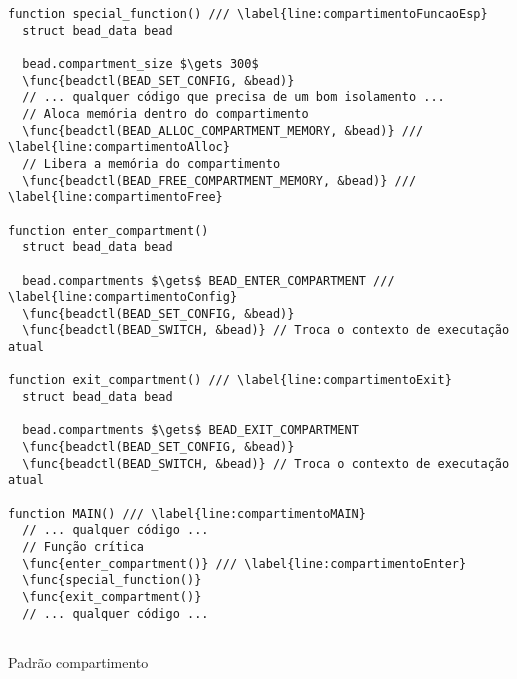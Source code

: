 \begin{pseudocode}
\begin{lstlisting}[language=pseudocode, style=pseudocode]
function special_function() /// \label{line:compartimentoFuncaoEsp}
  struct bead_data bead

  bead.compartment_size $\gets 300$
  \func{beadctl(BEAD_SET_CONFIG, &bead)}
  // ... qualquer código que precisa de um bom isolamento ...
  // Aloca memória dentro do compartimento
  \func{beadctl(BEAD_ALLOC_COMPARTMENT_MEMORY, &bead)} /// \label{line:compartimentoAlloc}
  // Libera a memória do compartimento
  \func{beadctl(BEAD_FREE_COMPARTMENT_MEMORY, &bead)} /// \label{line:compartimentoFree}

function enter_compartment()
  struct bead_data bead

  bead.compartments $\gets$ BEAD_ENTER_COMPARTMENT /// \label{line:compartimentoConfig}
  \func{beadctl(BEAD_SET_CONFIG, &bead)}
  \func{beadctl(BEAD_SWITCH, &bead)} // Troca o contexto de executação atual

function exit_compartment() /// \label{line:compartimentoExit}
  struct bead_data bead

  bead.compartments $\gets$ BEAD_EXIT_COMPARTMENT
  \func{beadctl(BEAD_SET_CONFIG, &bead)}
  \func{beadctl(BEAD_SWITCH, &bead)} // Troca o contexto de executação atual

function MAIN() /// \label{line:compartimentoMAIN}
  // ... qualquer código ...
  // Função crítica
  \func{enter_compartment()} /// \label{line:compartimentoEnter}
  \func{special_function()}
  \func{exit_compartment()}
  // ... qualquer código ...
  
\end{lstlisting}

  \caption{Padrão compartimento}
  \label{alg:compartimento}
\end{pseudocode}
